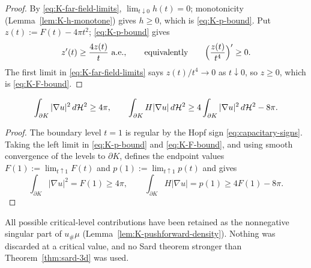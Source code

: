 \begin{proof}
By \eqref{eq:K-far-field-limits}, $\lim_{t\downarrow0}h(t)=0$; monotonicity
(Lemma~\ref{lem:K-h-monotone}) gives $h\ge0$, which is
\eqref{eq:K-p-bound}.  Put $z(t):=F(t)-4\pi t^2$; \eqref{eq:K-p-bound} gives
\begin{equation}\label{eq:K-z-ode}
  z'(t)\ge\frac{4z(t)}{t}\ \text{a.e.},
  \qquad\text{equivalently}\qquad
  \Bigl(\frac{z(t)}{t^4}\Bigr)'\ge0 .
\end{equation}
The first limit in \eqref{eq:K-far-field-limits} says $z(t)/t^4\to0$ as
$t\downarrow0$, so $z\ge0$, which is \eqref{eq:K-F-bound}.
\end{proof}

\begin{theorem}\label{thm:capacitary-inequalities}
\begin{equation}\label{eq:capacitary-inequalities}
  \int_{\partial K}|\nabla u|^2\,d\mathcal H^2\ge4\pi,
  \qquad
  \int_{\partial K}H|\nabla u|\,d\mathcal H^2
  \ge4\int_{\partial K}|\nabla u|^2\,d\mathcal H^2-8\pi .
\end{equation}
\end{theorem}

\begin{proof}
The boundary level $t=1$ is regular by the Hopf sign
\eqref{eq:capacitary-signs}.  Taking the left limit in
\eqref{eq:K-p-bound} and \eqref{eq:K-F-bound}, and using smooth convergence of
the levels to $\partial K$, defines the endpoint values
$F(1):=\lim_{t\uparrow1}F(t)$ and $p(1):=\lim_{t\uparrow1}p(t)$ and gives
\[
  \int_{\partial K}|\nabla u|^2=F(1)\ge4\pi,
  \qquad
  \int_{\partial K}H|\nabla u|=p(1)\ge4F(1)-8\pi .
\]
\end{proof}

\begin{remark}\label{rem:K-retained}
All possible critical-level contributions have been retained as the
nonnegative singular part of $u_\#\mu$
(Lemma~\ref{lem:K-pushforward-density}).  Nothing was discarded at a critical
value, and no Sard theorem stronger than
Theorem~\ref{thm:sard-3d} was used.
\end{remark}

